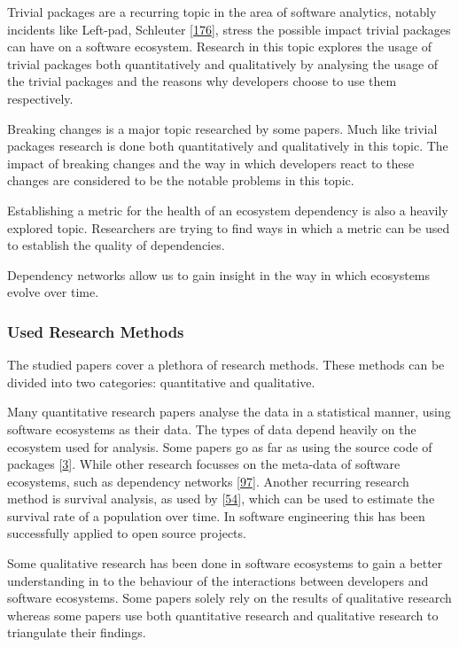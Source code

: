\documentclass[]{book}
\begin{document}
Trivial packages are a recurring topic in the area of software
analytics, notably incidents like Left-pad, Schleuter
{[}\protect\hyperlink{ref-NPM2016}{176}{]}, stress the possible impact
trivial packages can have on a software ecosystem. Research in this
topic explores the usage of trivial packages both quantitatively and
qualitatively by analysing the usage of the trivial packages and the
reasons why developers choose to use them respectively.

Breaking changes is a major topic researched by some papers. Much like
trivial packages research is done both quantitatively and qualitatively
in this topic. The impact of breaking changes and the way in which
developers react to these changes are considered to be the notable
problems in this topic.

Establishing a metric for the health of an ecosystem dependency is also
a heavily explored topic. Researchers are trying to find ways in which a
metric can be used to establish the quality of dependencies.

Dependency networks allow us to gain insight in the way in which
ecosystems evolve over time.

\subsubsection{Used Research Methods}\label{used-research-methods}

The studied papers cover a plethora of research methods. These methods
can be divided into two categories: quantitative and qualitative.

Many quantitative research papers analyse the data in a statistical
manner, using software ecosystems as their data. The types of data
depend heavily on the ecosystem used for analysis. Some papers go as far
as using the source code of packages
{[}\protect\hyperlink{ref-Abdalkareem2017}{3}{]}. While other research
focusses on the meta-data of software ecosystems, such as dependency
networks {[}\protect\hyperlink{ref-Kikas2017}{97}{]}. Another recurring
research method is survival analysis, as used by
{[}\protect\hyperlink{ref-Decan2018}{54}{]}, which can be used to
estimate the survival rate of a population over time. In software
engineering this has been successfully applied to open source projects.

Some qualitative research has been done in software ecosystems to gain a
better understanding in to the behaviour of the interactions between
developers and software ecosystems. Some papers solely rely on the
results of qualitative research whereas some papers use both
quantitative research and qualitative research to triangulate their
findings.
\end{document}
